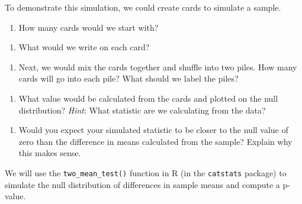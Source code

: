 \documentclass[
]{report}
\providecommand{\tightlist}{%
  \setlength{\itemsep}{0pt}\setlength{\parskip}{0pt}}
\begin{document}
To demonstrate this simulation, we could create cards to simulate a sample.

\begin{enumerate}
\def\labelenumi{\arabic{enumi}.}
\setcounter{enumi}{9}
\tightlist
\item
  How many cards would we start with?
\end{enumerate}

\vspace{0.3in}

\begin{enumerate}
\def\labelenumi{\arabic{enumi}.}
\setcounter{enumi}{10}
\tightlist
\item
  What would we write on each card?
\end{enumerate}

\vspace{0.3in}

\newpage

\begin{enumerate}
\def\labelenumi{\arabic{enumi}.}
\setcounter{enumi}{11}
\tightlist
\item
  Next, we would mix the cards together and shuffle into two piles. How many cards will go into each pile? What should we label the piles?
\end{enumerate}

\vspace{.8in}

\begin{enumerate}
\def\labelenumi{\arabic{enumi}.}
\setcounter{enumi}{12}
\tightlist
\item
  What value would be calculated from the cards and plotted on the null distribution? \emph{Hint}: What statistic are we calculating from the data?
\end{enumerate}

\vspace{0.3in}

\begin{enumerate}
\def\labelenumi{\arabic{enumi}.}
\setcounter{enumi}{13}
\tightlist
\item
  Would you expect your simulated statistic to be closer to the null value of zero than the difference in means calculated from the sample? Explain why this makes sense.
\end{enumerate}

\vspace{0.8in}

We will use the \texttt{two\_mean\_test()} function in R (in the \texttt{catstats} package) to simulate the null distribution of differences in sample means and compute a p-value.
\end{document}
